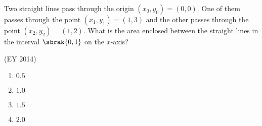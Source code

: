      \item Two straight lines pass through the origin $(x_0, y_0) = (0,0)$. One of them passes
through the point $(x_1, y_1) = (1,3)$ and the other passes through the point
$(x_2,y_2) = (1,2)$.
What is the area enclosed between the straight lines in the interval $\sbrak{0, 1}$ on
the $x$-axis?

    \hfill{(EY  2014)}
    \begin{multicols}{4}
    \begin{enumerate}
        \item  $0.5$
        \item  $1.0$
        \item  $1.5$
        \item  $2.0$
    \end{enumerate}
    \end{multicols}
